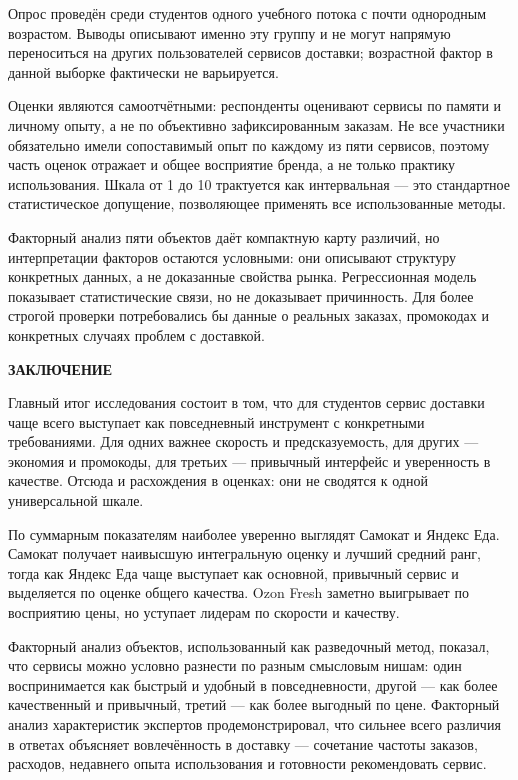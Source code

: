 \documentclass[14pt,a4paper]{extarticle}
\newcommand{\structsection}[1]{%
    \clearpage\phantomsection%
    \begin{center}{\bfseries \MakeUppercase{#1}}\end{center}%
    \addcontentsline{toc}{section}{#1}%
}
\begin{document}
Опрос проведён среди студентов одного учебного потока с почти однородным возрастом. Выводы описывают именно эту группу и не могут напрямую переноситься на других пользователей сервисов доставки; возрастной фактор в данной выборке фактически не варьируется.

Оценки являются самоотчётными: респонденты оценивают сервисы по памяти и личному опыту, а не по объективно зафиксированным заказам. Не все участники обязательно имели сопоставимый опыт по каждому из пяти сервисов, поэтому часть оценок отражает и общее восприятие бренда, а не только практику использования. Шкала от 1 до 10 трактуется как интервальная — это стандартное статистическое допущение, позволяющее применять все использованные методы.

Факторный анализ пяти объектов даёт компактную карту различий, но интерпретации факторов остаются условными: они описывают структуру конкретных данных, а не доказанные свойства рынка. Регрессионная модель показывает статистические связи, но не доказывает причинность. Для более строгой проверки потребовались бы данные о реальных заказах, промокодах и конкретных случаях проблем с доставкой.

\structsection{Заключение}

Главный итог исследования состоит в том, что для студентов сервис доставки чаще всего выступает как повседневный инструмент с конкретными требованиями. Для одних важнее скорость и предсказуемость, для других — экономия и промокоды, для третьих — привычный интерфейс и уверенность в качестве. Отсюда и расхождения в оценках: они не сводятся к одной универсальной шкале.

По суммарным показателям наиболее уверенно выглядят Самокат и Яндекс Еда. Самокат получает наивысшую интегральную оценку и лучший средний ранг, тогда как Яндекс Еда чаще выступает как основной, привычный сервис и выделяется по оценке общего качества. Ozon Fresh заметно выигрывает по восприятию цены, но уступает лидерам по скорости и качеству.

Факторный анализ объектов, использованный как разведочный метод, показал, что сервисы можно условно разнести по разным смысловым нишам: один воспринимается как быстрый и удобный в повседневности, другой — как более качественный и привычный, третий — как более выгодный по цене. Факторный анализ характеристик экспертов продемонстрировал, что сильнее всего различия в ответах объясняет вовлечённость в доставку — сочетание частоты заказов, расходов, недавнего опыта использования и готовности рекомендовать сервис.
\end{document}
